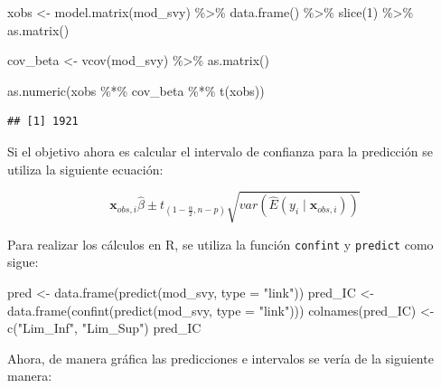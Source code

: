 \documentclass[
  12pt,
]{book}
\newenvironment{Shaded}{\begin{snugshade}}{\end{snugshade}}
\newcommand{\AttributeTok}[1]{\textcolor[rgb]{0.77,0.63,0.00}{#1}}
\newcommand{\DecValTok}[1]{\textcolor[rgb]{0.00,0.00,0.81}{#1}}
\newcommand{\FunctionTok}[1]{\textcolor[rgb]{0.00,0.00,0.00}{#1}}
\newcommand{\NormalTok}[1]{#1}
\newcommand{\OtherTok}[1]{\textcolor[rgb]{0.56,0.35,0.01}{#1}}
\newcommand{\SpecialCharTok}[1]{\textcolor[rgb]{0.00,0.00,0.00}{#1}}
\newcommand{\StringTok}[1]{\textcolor[rgb]{0.31,0.60,0.02}{#1}}
\begin{document}
\begin{Shaded}
\begin{Highlighting}[]
\NormalTok{xobs }\OtherTok{\textless{}{-}} \FunctionTok{model.matrix}\NormalTok{(mod\_svy) }\SpecialCharTok{\%\textgreater{}\%}
        \FunctionTok{data.frame}\NormalTok{() }\SpecialCharTok{\%\textgreater{}\%} \FunctionTok{slice}\NormalTok{(}\DecValTok{1}\NormalTok{) }\SpecialCharTok{\%\textgreater{}\%} \FunctionTok{as.matrix}\NormalTok{()}

\NormalTok{cov\_beta }\OtherTok{\textless{}{-}} \FunctionTok{vcov}\NormalTok{(mod\_svy) }\SpecialCharTok{\%\textgreater{}\%} \FunctionTok{as.matrix}\NormalTok{()}

\FunctionTok{as.numeric}\NormalTok{(xobs }\SpecialCharTok{\%*\%}\NormalTok{ cov\_beta }\SpecialCharTok{\%*\%} \FunctionTok{t}\NormalTok{(xobs))}
\end{Highlighting}
\end{Shaded}

\begin{verbatim}
## [1] 1921
\end{verbatim}

Si el objetivo ahora es calcular el intervalo de confianza para la predicción se utiliza la siguiente ecuación:

\[
\boldsymbol{x}_{obs,i}\hat{\beta}\pm t_{\left(1-\frac{\alpha}{2},n-p\right)}\sqrt{var\left(\hat{E}\left(y_{i}\mid\boldsymbol{x}_{obs,i}\right)\right)}
\]

Para realizar los cálculos en R, se utiliza la función \texttt{confint} y \texttt{predict} como sigue:

\begin{Shaded}
\begin{Highlighting}[]
\NormalTok{pred }\OtherTok{\textless{}{-}} \FunctionTok{data.frame}\NormalTok{(}\FunctionTok{predict}\NormalTok{(mod\_svy, }\AttributeTok{type =} \StringTok{"link"}\NormalTok{))}
\NormalTok{pred\_IC }\OtherTok{\textless{}{-}} \FunctionTok{data.frame}\NormalTok{(}\FunctionTok{confint}\NormalTok{(}\FunctionTok{predict}\NormalTok{(mod\_svy, }\AttributeTok{type =} \StringTok{"link"}\NormalTok{)))}
\FunctionTok{colnames}\NormalTok{(pred\_IC) }\OtherTok{\textless{}{-}} \FunctionTok{c}\NormalTok{(}\StringTok{"Lim\_Inf"}\NormalTok{, }\StringTok{"Lim\_Sup"}\NormalTok{)}
\NormalTok{pred\_IC}
\end{Highlighting}
\end{Shaded}

Ahora, de manera gráfica las predicciones e intervalos se vería de la siguiente manera:
\end{document}
